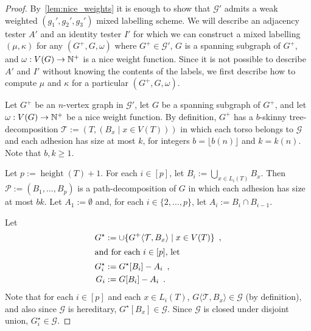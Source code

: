 \documentclass{patmorin}
\renewcommand{\geq}{\geqslant}
\newcommand{\torso}[2]{{#1}\langle{#2}\rangle}
\DeclareMathOperator{\height}{height}
\DeclarePairedDelimiter{\set}{\{}{\}}
\begin{document}
\begin{proof}
  By~\cref{lem:nice_weights} it is enough to show that $\mathcal{G}'$ admits a weak weighted $(g_1',g_2',g_3')$ mixed labelling scheme. We will describe an adjacency tester $A'$ and an identity tester $I'$ for which we can construct a mixed labelling $(\mu,\kappa)$ for any $(G^+,G,\omega)$ where $G^+\in\mathcal{G}'$, $G$ is a spanning subgraph of $G^+$, and $\omega:V(G)\to\mathbb{N}^+$ is a nice weight function.
  Since it is not possible to describe $A'$ and $I'$ without knowing the contents of the labels, we first describe how to compute $\mu$ and $\kappa$ for a particular $(G^+,G,\omega)$.

  Let $G^+$ be an $n$-vertex graph in $\mathcal{G}'$, let $G$ be a spanning subgraph of $G^+$, and let $\omega:V(G)\to\mathbb{N}^+$ be a nice weight function.  By definition, $G^+$ has a $b$-skinny tree-decomposition $\mathcal{T}:=(T,(B_x\mid x\in V(T)))$ in which each torso belongs to $\mathcal{G}$ and each adhesion has size at most $k$, for integers $b =\lfloor b(n)\rfloor$ and $k = k(n)$. Note that $b,k\geq1$.

  Let $p:=\height(T)+1$.
  For each $i\in[p]$, let $B_i:=\bigcup_{x\in L_i(T)} B_x$.  Then $\mathcal{P}:=(B_1,\ldots,B_p)$ is a path-decomposition of $G$ in which each adhesion has size at most $bk$.
  Let $A_1:=\emptyset$ and, for each $i\in\{2,\ldots,p\}$, let $A_i:=B_i\cap B_{i-1}$.

  Let
  \begin{align*}
    G^\star
     & := \cup\set{\torso{G^+}{\mathcal{T},B_x}\mid x\in V(T)}\enspace, \\
    \intertext{and for each $i\in[p]$, let }
    G^\star_i
     & := G^\star[B_i]-A_i\enspace,                                     \\
    G_i
     & := G[B_i]-A_i\enspace.
  \end{align*}
  Note that for each $i\in[p]$ and each $x\in L_i(T)$, $\torso{G}{\mathcal{T},B_x}\in\mathcal{G}$
  (by definition), and also since $\mathcal{G}$ is hereditary, $G^\star[B_x]\in\mathcal{G}$.  Since $\mathcal{G}$ is closed under disjoint union, $G^\star_i\in\mathcal{G}$.


\end{proof}
\end{document}
